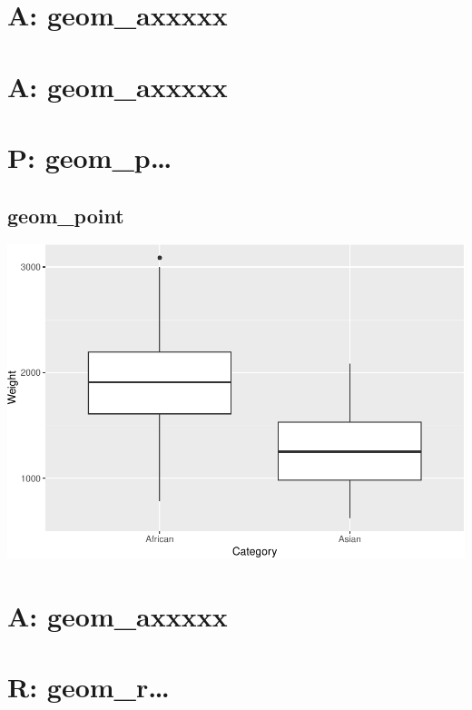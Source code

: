 \documentclass[
]{book}
\begin{document}
\hypertarget{a-geom_axxxxx-4}{%
\chapter{A: geom\_axxxxx}\label{a-geom_axxxxx-4}}

\hypertarget{a-geom_axxxxx-5}{%
\chapter{A: geom\_axxxxx}\label{a-geom_axxxxx-5}}

\hypertarget{p-geom_p}{%
\chapter{P: geom\_p\ldots{}}\label{p-geom_p}}

\hypertarget{point}{%
\section{geom\_point}\label{point}}

\includegraphics{Data-Visualisation-geom-Encyclopedia_files/figure-latex/unnamed-chunk-46-1.pdf}

\hypertarget{a-geom_axxxxx-6}{%
\chapter{A: geom\_axxxxx}\label{a-geom_axxxxx-6}}

\hypertarget{r-geom_r}{%
\chapter{R: geom\_r\ldots{}}\label{r-geom_r}}
\end{document}
